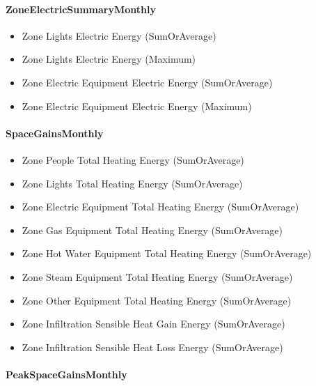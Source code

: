 \paragraph{ZoneElectricSummaryMonthly}\label{zoneelectricsummarymonthly}

\begin{itemize}
\item
  Zone Lights Electric Energy (SumOrAverage)
\item
  Zone Lights Electric Energy (Maximum)
\item
  Zone Electric Equipment Electric Energy (SumOrAverage)
\item
  Zone Electric Equipment Electric Energy (Maximum)
\end{itemize}

\paragraph{SpaceGainsMonthly}\label{spacegainsmonthly}

\begin{itemize}
\item
  Zone People Total Heating Energy (SumOrAverage)
\item
  Zone Lights Total Heating Energy (SumOrAverage)
\item
  Zone Electric Equipment Total Heating Energy (SumOrAverage)
\item
  Zone Gas Equipment Total Heating Energy (SumOrAverage)
\item
  Zone Hot Water Equipment Total Heating Energy (SumOrAverage)
\item
  Zone Steam Equipment Total Heating Energy (SumOrAverage)
\item
  Zone Other Equipment Total Heating Energy (SumOrAverage)
\item
  Zone Infiltration Sensible Heat Gain Energy (SumOrAverage)
\item
  Zone Infiltration Sensible Heat Loss Energy (SumOrAverage)
\end{itemize}

\paragraph{PeakSpaceGainsMonthly}\label{peakspacegainsmonthly}

